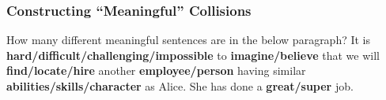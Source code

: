 \begin{frame}\frametitle{Constructing ``Meaningful'' Collisions}
\begin{exampleblock}{How many different meaningful sentences are in the below paragraph?}
It is \textbf{hard/difficult/challenging/impossible} to \textbf{imagine/believe} that we will \textbf{find/locate/hire} another \textbf{employee/person} having similar \textbf{abilities/skills/character} as Alice. She has done a \textbf{great/super} job.
\end{exampleblock}
\end{frame}
